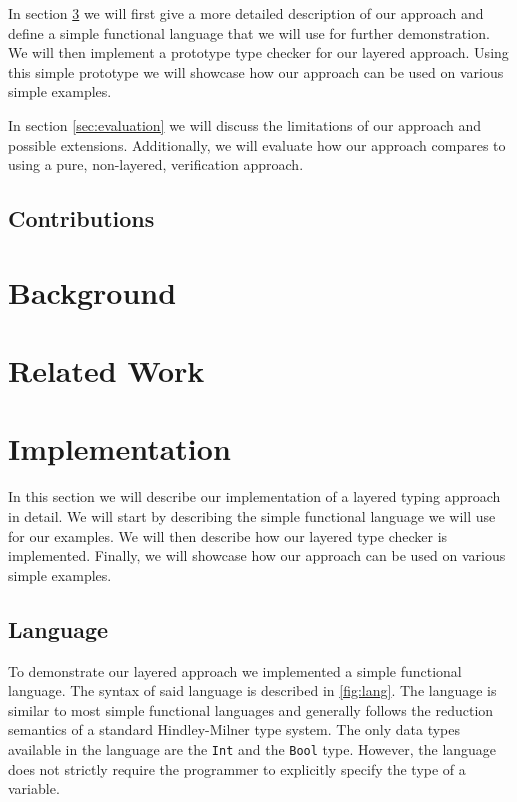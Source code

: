 \documentclass[acmsmall, review, screen]{acmart}
\begin{document}
In section \ref{sec:implementation} we will first give a more detailed description of our approach and define a simple functional language that we will use for further demonstration. We will then implement a prototype type checker for our layered approach. Using this simple prototype we will showcase how our approach can be used on various simple examples.

In section \ref{sec:evaluation} we will discuss the limitations of our approach and possible extensions. Additionally, we will evaluate how our approach compares to using a pure, non-layered, verification approach.

\subsection{Contributions}
\section{Background}
\label{sec:background}
\section{Related Work}
\label{sec:related}
\section{Implementation}
\label{sec:implementation}

In this section we will describe our implementation of a layered typing approach in detail. We will start by describing the simple functional language we will use for our examples. We will then describe how our layered type checker is implemented. Finally, we will showcase how our approach can be used on various simple examples.

\subsection{Language}
\label{ssec:language}

To demonstrate our layered approach we implemented a simple functional language. The syntax of said language is described in \ref{fig:lang}. The language is similar to most simple functional languages and generally follows the reduction semantics of a standard Hindley-Milner type system. The only data types available in the language are the \texttt{Int} and the \texttt{Bool} type. However, the language does not strictly require the programmer to explicitly specify the type of a variable.
\end{document}

